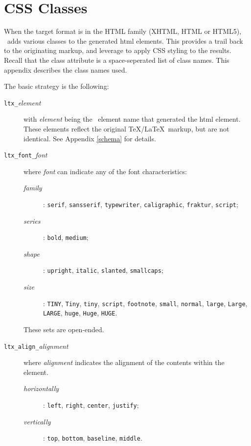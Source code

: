 \documentclass{book}
\begin{document}
\chapter{CSS Classes}\label{cssclasses}
When the target format is in the HTML family (XHTML, HTML or HTML5),
\LaTeXML\ adds various classes to the generated html elements.
This provides a trail back to the originating markup,
and leverage to apply CSS styling to the results.
Recall that the class attribute is a space-seperated list of class names.
This appendix describes the class names used.

The basic strategy is the following:
\begin{description}
\item[\texttt{ltx\_}\textit{element}] with \textit{element} being the \LaTeXML\ element name
  that generated the html element.
  These elements reflect the original \TeX/\LaTeX\ markup, but are
  not identical. See Appendix \ref{schema} for details.
\item[\texttt{ltx\_font\_}\textit{font}] where \textit{font} can indicate any 
  of the font characteristics:
  \begin{description}
    \item[\textit{family}]:  \texttt{serif}, \texttt{sansserif}, \texttt{typewriter},
      \texttt{caligraphic}, \texttt{fraktur}, \texttt{script};
    \item[\textit{series}]:  \texttt{bold}, \texttt{medium};
    \item[\textit{shape}]:   \texttt{upright}, \texttt{italic}, \texttt{slanted}, \texttt{smallcaps};
    \item[\textit{size}]: \texttt{TINY}, \texttt{Tiny}, \texttt{tiny}, \texttt{script},
                 \texttt{footnote}, \texttt{small}, \texttt{normal}, \texttt{large},
                 \texttt{Large}, \texttt{LARGE}, \texttt{huge}, \texttt{Huge}, \texttt{HUGE}.
  \end{description}
  These sets are open-ended.
\item[\texttt{ltx\_align\_}\textit{alignment}] where \textit{alignment}
  indicates the alignment of the contents within the element.
  \begin{description}
    \item[\textit{horizontally}]: \texttt{left}, \texttt{right}, \texttt{center}, \texttt{justify};
    \item[\textit{vertically}]:   \texttt{top}, \texttt{bottom}, \texttt{baseline}, \texttt{middle}.

\end{description}
\end{description}
\end{document}
